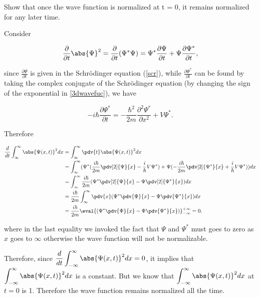 \documentclass[a4paper,12pt]{report}
\begin{document}
{Show that once the wave function is normalized at t = 0, it remains normalized for any later time.}
{Consider

\begin{equation}
  \frac{\partial }{\partial t} \abs{\Psi }^2 = \frac{\partial }{\partial t} (\Psi^*\Psi ) = \Psi ^* \frac{\partial \Psi }{\partial t} + \Psi \frac{\partial \Psi ^*}{\partial t}, 
\end{equation}

since \(\displaystyle \frac{\partial \Psi }{\partial t} \) is given in the Schrödinger equation (\cref{scr}), while \(\displaystyle \frac{\partial \Psi ^*}{\partial t} \) can be found by taking the complex conjugate of the Schrödinger equation (by changing the sign of the exponential in \cref{3dwavefuc}), we have
		
\begin{equation}
  -i \hbar \frac{\partial \Psi^*}{\partial t}=-\frac{\hbar^2}{2 m} \frac{\partial^2 \Psi^*}{\partial x^2}+V\Psi^*.
\end{equation}
		
Therefore
		
\begin{equation}
  \begin{aligned}
    \frac{d}{dt}  \int_{\infty}^{\infty}   \abs{\Psi(x,t)}^2 dx  &= \int_{\infty}^{\infty}   \pdv{t} \abs{\Psi(x,t)}^2 dx \\ &= \int_{\infty}^{\infty}   (\Psi^*(\frac{i\hbar}{2m}\pdv[2]{\Psi}{x} - \frac{i}{\hbar}V\Psi^*) + \Psi(-\frac{i\hbar}{2m}\pdv[2]{\Psi^*}{x} + \frac{i}{\hbar}V\Psi^*))dx \\ &= \int_{\infty}^{\infty}   \frac{i\hbar}{2m}(\Psi^*\pdv[2]{\Psi}{x} - \Psi\pdv[2]{\Psi^*}{x})dx \\ &= \frac{i\hbar}{2m}\int_{\infty}^{\infty}  \pdv{x}(\Psi^*\pdv{\Psi}{x} - \Psi\pdv{\Psi^*}{x})dx \\ &= \frac{i\hbar}{2m} \eval{(\Psi^*\pdv{\Psi}{x} - \Psi\pdv{\Psi^*}{x})}_{-\infty}^{+\infty} = 0. \label{ddtpsi2}
  \end{aligned}
\end{equation}

where in the last equality we invoked the fact that \(\Psi\) and \(\Psi^*\) must goes to zero as \(x\) goes to \(\infty\) otherwise the wave function will not be normalizable.
		
Therefore, since \(\displaystyle \frac{d}{dt}  \int_{-\infty}^{\infty} \abs{\Psi (x,t)}^2 dx = 0\), it implies that \(\displaystyle \int_{-\infty}^{\infty}   \abs{\Psi(x,t)}^2 dx\) is a constant. But we know that \(\displaystyle \int_{-\infty}^{\infty}   \abs{\Psi(x,t)}^2 dx\) at \(t = 0\) is 1. Therefore the wave function remains normalized all the time.}		
		
\end{document}
